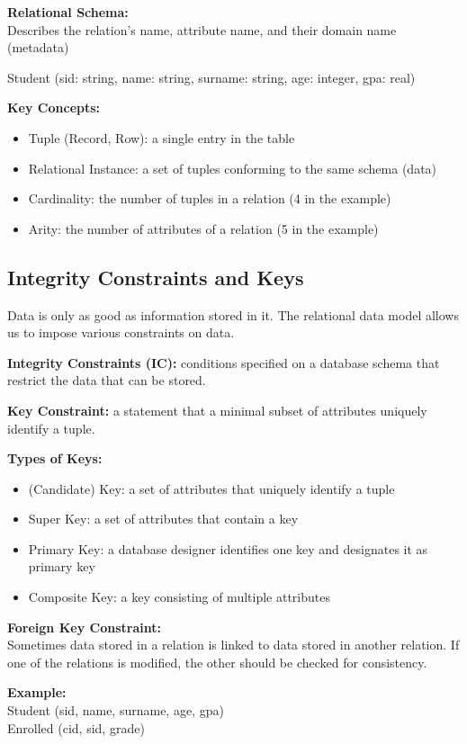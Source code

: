 \documentclass{article}
\begin{document}
\textbf{Relational Schema:}\\
Describes the relation's name, attribute name, and their domain name (metadata)

Student (sid: string, name: string, surname: string, age: integer, gpa: real)

\textbf{Key Concepts:}
\begin{itemize}
    \item Tuple (Record, Row): a single entry in the table
    \item Relational Instance: a set of tuples conforming to the same schema (data)
    \item Cardinality: the number of tuples in a relation (4 in the example)
    \item Arity: the number of attributes of a relation (5 in the example)
\end{itemize}

\subsection*{Integrity Constraints and Keys}
Data is only as good as information stored in it. The relational data model allows us to impose various constraints on data.

\textbf{Integrity Constraints (IC):} conditions specified on a database schema that restrict the data that can be stored.

\textbf{Key Constraint:} a statement that a minimal subset of attributes uniquely identify a tuple.

\textbf{Types of Keys:}
\begin{itemize}
    \item (Candidate) Key: a set of attributes that uniquely identify a tuple
    \item Super Key: a set of attributes that contain a key
    \item Primary Key: a database designer identifies one key and designates it as primary key
    \item Composite Key: a key consisting of multiple attributes
\end{itemize}

\textbf{Foreign Key Constraint:}\\
Sometimes data stored in a relation is linked to data stored in another relation. If one of the relations is modified, the other should be checked for consistency.

\textbf{Example:}\\
Student (sid, name, surname, age, gpa)\\
Enrolled (cid, sid, grade)
\end{document}
